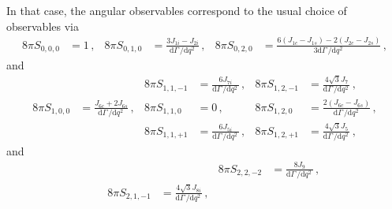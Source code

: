 \documentclass[aps,nofootinbib,preprintnumbers,prd,twocolumn]{revtex4-1}
\newcommand{\rmdx}[1]{\mbox{d} #1 \,} %
\begin{document}
\begin{widetext}
In that case, the angular observables correspond to the usual choice of observables via
\begin{equation}
\begin{aligned}
    8\pi S_{0, 0,  0} & = 1\,,                                                                             &
    8\pi S_{0, 1,  0} & = \frac{3 J_{1i} - J_{2i}}{\rmdx{\Gamma}/\rmdx{q^2}}\,,                            &
    8\pi S_{0, 2,  0} & = \frac{6 (J_{1c} - J_{1s}) - 2(J_{2c} - J_{2s})}{3\rmdx{\Gamma}/\rmdx{q^2}}\,,
\end{aligned}
\end{equation}
and
\begin{equation}
\begin{aligned}
%
                      &                                                                                    &
    8\pi S_{1, 1, -1} & = \frac{6 J_{7i}}{\rmdx{\Gamma}/\rmdx{q^2}}\,,                                     &
    8\pi S_{1, 2, -1} & = \frac{4 \sqrt{3} J_{7}}{\rmdx{\Gamma}/\rmdx{q^2}}\,,                             \\
%
    8\pi S_{1, 0,  0} & = \frac{J_{6c} + 2 J_{6s}}{\rmdx{\Gamma}/\rmdx{q^2}}\,,                            &
    8\pi S_{1, 1,  0} & = 0\,,                                                                             &
    8\pi S_{1, 2,  0} & = \frac{2(J_{6c} - J_{6s})}{\rmdx{\Gamma}/\rmdx{q^2}}\,,                           \\
%
                      &                                                                                    &
    8\pi S_{1, 1, +1} & = \frac{6 J_{5i}}{\rmdx{\Gamma}/\rmdx{q^2}}\,,                                     &
    8\pi S_{1, 2, +1} & = \frac{4 \sqrt{3} J_{5}}{\rmdx{\Gamma}/\rmdx{q^2}}\,,
\end{aligned}
\end{equation}
and
\begin{equation}
\begin{aligned}
%
                      &                                                                                    &
                      &                                                                                    &
    8\pi S_{2, 2, -2} & = \frac{8 J_9}{\rmdx{\Gamma}/\rmdx{q^2}}\,,                                        \\
%
                      &                                                                                    &
    8\pi S_{2, 1, -1} & = \frac{4 \sqrt{3} J_{8i}}{\rmdx{\Gamma}/\rmdx{q^2}}\,,                            &

\end{aligned}
\end{equation}
\end{widetext}
\end{document}
